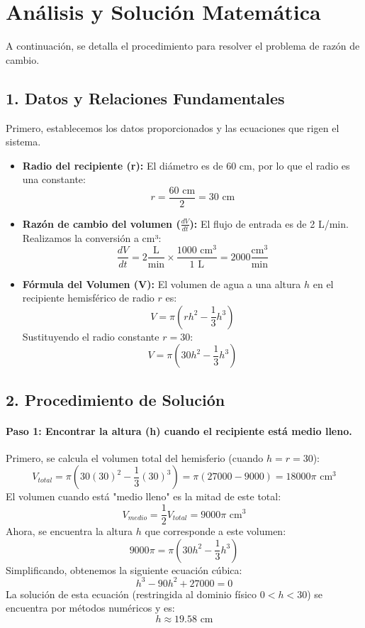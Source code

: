 \documentclass[12pt, letterpaper]{article}
\begin{document}
\section*{Análisis y Solución Matemática}

A continuación, se detalla el procedimiento para resolver el problema de razón de cambio.

\subsection*{1. Datos y Relaciones Fundamentales}
Primero, establecemos los datos proporcionados y las ecuaciones que rigen el sistema.

\begin{itemize}
    \item \textbf{Radio del recipiente (r):} El diámetro es de 60 cm, por lo que el radio es una constante:
    $$r = \frac{60 \text{ cm}}{2} = 30 \text{ cm}$$

    \item \textbf{Razón de cambio del volumen ($\frac{dV}{dt}$):} El flujo de entrada es de 2 L/min. Realizamos la conversión a cm³:
    $$\frac{dV}{dt} = 2 \frac{\text{L}}{\text{min}} \times \frac{1000 \text{ cm}^3}{1 \text{ L}} = 2000 \frac{\text{cm}^3}{\text{min}}$$

    \item \textbf{Fórmula del Volumen (V):} El volumen de agua a una altura $h$ en el recipiente hemisférico de radio $r$ es:
    $$V = \pi \left(rh^2 - \frac{1}{3}h^3\right)$$
    Sustituyendo el radio constante $r=30$:
    $$V = \pi \left(30h^2 - \frac{1}{3}h^3\right)$$
\end{itemize}

\subsection*{2. Procedimiento de Solución}

\paragraph{Paso 1: Encontrar la altura (h) cuando el recipiente está medio lleno.}
Primero, se calcula el volumen total del hemisferio (cuando $h=r=30$):
$$V_{total} = \pi \left(30(30)^2 - \frac{1}{3}(30)^3\right) = \pi(27000 - 9000) = 18000\pi \text{ cm}^3$$
El volumen cuando está "medio lleno" es la mitad de este total:
$$V_{medio} = \frac{1}{2} V_{total} = 9000\pi \text{ cm}^3$$
Ahora, se encuentra la altura $h$ que corresponde a este volumen:
$$9000\pi = \pi \left(30h^2 - \frac{1}{3}h^3\right)$$
Simplificando, obtenemos la siguiente ecuación cúbica:
$$h^3 - 90h^2 + 27000 = 0$$
La solución de esta ecuación (restringida al dominio físico $0 < h < 30$) se encuentra por métodos numéricos y es:
$$h \approx 19.58 \text{ cm}$$
\end{document}
